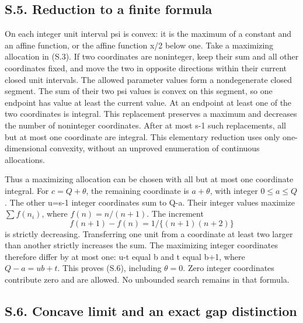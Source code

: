 \documentclass[
  11pt,
]{article}
\begin{document}
\subsection{S.5. Reduction to a finite
formula}\label{s.5.-reduction-to-a-finite-formula}

On each integer unit interval psi is convex: it is the maximum of a
constant and an affine function, or the affine function x/2 below one.
Take a maximizing allocation in (S.3). If two coordinates are
noninteger, keep their sum and all other coordinates fixed, and move the
two in opposite directions within their current closed unit intervals.
The allowed parameter values form a nondegenerate closed segment. The
sum of their two psi values is convex on this segment, so one endpoint
has value at least the current value. At an endpoint at least one of the
two coordinates is integral. This replacement preserves a maximum and
decreases the number of noninteger coordinates. After at most s-1 such
replacements, all but at most one coordinate are integral. This
elementary reduction uses only one-dimensional convexity, without an
unproved enumeration of continuous allocations.

Thus a maximizing allocation can be chosen with all but at most one
coordinate integral. For \(c=Q+\theta\), the remaining coordinate is
\(a+\theta\), with integer \(0\le a\le Q\). The other u=s-1 integer
coordinates sum to Q-a. Their integer values maximize \(\sum f(n_i)\),
where \(f(n)=n/(n+1)\). The increment \[
                   f(n+1)-f(n)=1/\{(n+1)(n+2)\}
\] is strictly decreasing. Transferring one unit from a coordinate at
least two larger than another strictly increases the sum. The maximizing
integer coordinates therefore differ by at most one: u-t equal b and t
equal b+1, where \(Q-a=ub+t\). This proves (S.6), including
\(\theta=0\). Zero integer coordinates contribute zero and are allowed.
No unbounded search remains in that formula.

\subsection{S.6. Concave limit and an exact gap
distinction}\label{s.6.-concave-limit-and-an-exact-gap-distinction}
\end{document}
